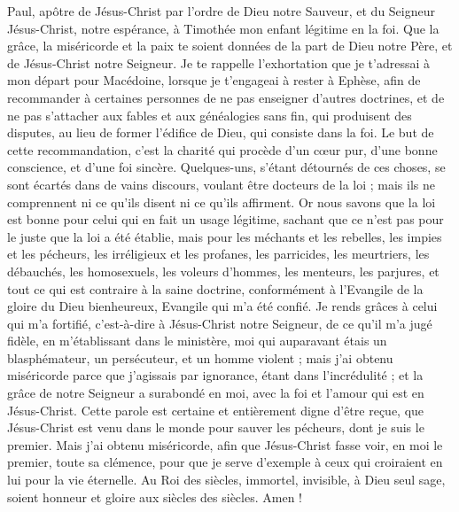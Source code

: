 \begin{multicols}{2}
\TextTitle{[Introduction]}
\VerseOne{}Paul, apôtre de Jésus-Christ par l’ordre de Dieu notre Sauveur, et du Seigneur Jésus-Christ, notre espérance,
à Timothée mon enfant légitime en la foi. Que la grâce, la miséricorde et la paix te soient données de la part de Dieu notre Père, et de Jésus-Christ notre Seigneur.
Je te rappelle l’exhortation que je t’adressai à mon départ pour Macédoine, lorsque je t’engageai à rester à Ephèse, afin de recommander à certaines personnes de ne pas enseigner d’autres doctrines,
et de ne pas s’attacher aux fables et aux généalogies sans fin, qui produisent des disputes, au lieu de former l’édifice de Dieu, qui consiste dans la foi.
Le but de cette recommandation, c’est la charité qui procède d'un cœur pur, d'une bonne conscience, et d'une foi sincère.
Quelques-uns, s'étant détournés de ces choses, se sont écartés dans de vains discours,
voulant être docteurs de la loi ; mais ils ne comprennent ni ce qu’ils disent ni ce qu’ils affirment.
Or nous savons que la loi est bonne pour celui qui en fait un usage légitime,
sachant que ce n’est pas pour le juste que la loi a été établie, mais pour les méchants et les rebelles, les impies et les pécheurs, les irréligieux et les profanes, les parricides, les meurtriers,
les débauchés, les homosexuels, les voleurs d’hommes, les menteurs, les parjures, et tout ce qui est contraire à la saine doctrine,
conformément à l'Evangile de la gloire du Dieu bienheureux, Evangile qui m'a été confié.
Je rends grâces à celui qui m'a fortifié, c'est-à-dire à Jésus-Christ notre Seigneur, de ce qu'il m'a jugé fidèle, en m’établissant dans le ministère,
moi qui auparavant étais un blasphémateur, un persécuteur, et un homme violent ; mais j'ai obtenu miséricorde parce que j’agissais par ignorance, étant dans l’incrédulité ;
et la grâce de notre Seigneur a surabondé en moi, avec la foi et l'amour qui est en Jésus-Christ.
Cette parole est certaine et entièrement digne d'être reçue, que Jésus-Christ est venu dans le monde pour sauver les pécheurs, dont je suis le premier.
Mais j'ai obtenu miséricorde, afin que Jésus-Christ fasse voir, en moi le premier, toute sa clémence, pour que je serve d'exemple à ceux qui croiraient en lui pour la vie éternelle.
Au Roi des siècles, immortel, invisible, à Dieu seul sage, soient honneur et gloire aux siècles des siècles. Amen !

\end{multicols}

